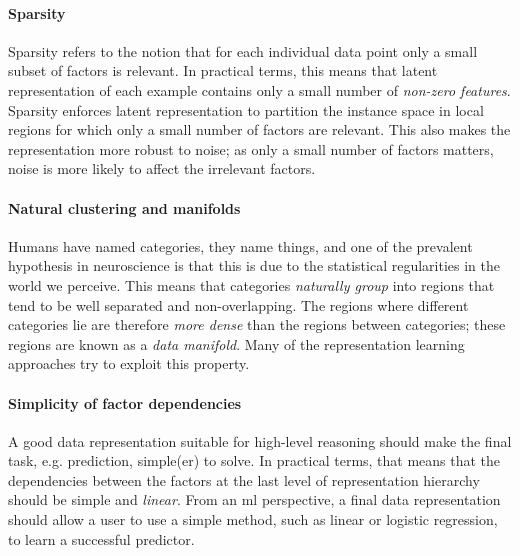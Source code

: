 \paragraph{\textbf{Sparsity}}
Sparsity refers to the notion that for each individual data point only a small subset of factors is relevant.
In practical terms, this means that latent representation of each example contains only a small number of \textit{non-zero features}.
Sparsity enforces latent representation to partition the instance space in local regions for which only a small number of factors are relevant.
This also makes the representation more robust to noise; as only a small number of factors matters, noise is more likely to affect the irrelevant factors.




\paragraph{\textbf{Natural clustering and manifolds}}
Humans have named categories, they name things, and one of the prevalent hypothesis in neuroscience is that this is due to the statistical regularities in the world we perceive.
This means that categories \textit{naturally group} into regions that tend to be well separated and non-overlapping.
The regions where different categories lie are therefore \textit{more dense} than the regions between categories; these regions are known as a \textit{data manifold}.
Many of the representation learning approaches try to exploit this property.





\paragraph{\textbf{Simplicity of factor dependencies}}
A good data representation suitable for high-level reasoning should make the final task, e.g. prediction, simple(er) to solve.
In practical terms, that means that the dependencies between the factors at the last level of representation hierarchy should be simple and \textit{linear}.
From an \gls{ml} perspective, a final data representation should allow a user to use a simple method, such as linear or logistic regression, to learn a successful predictor.












